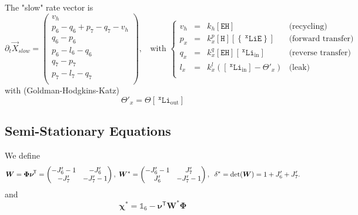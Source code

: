 \documentclass[aps,onecolumn,12pt]{revtex4}
\newcommand{\mychem}[1]{\mathtt{#1}}
\newcommand{\myconc}[1]{\left\lbrack{#1}\right\rbrack}
\newcommand{\spLi}[1]{{~^{\mychem{#1}}\mychem{Li}}}
\newcommand{\spEout}{\mychem{E}}
\newcommand{\spLiE}[1]{\left\lbrace\spLi{#1}\spEout\right\rbrace}
\newcommand{\LiE}[1]{\myconc{\spLiE{#1}}}
\newcommand{\spLiIn}[1]{{\spLi{#1}}_{\mathrm{in}}}
\newcommand{\LiIn}[1]{\myconc{\spLiIn{#1}}}
\newcommand{\spLiOut}[1]{{\spLi{#1}}_{\mathrm{out}}}
\newcommand{\LiOut}[1]{\myconc{\spLiOut{#1}}}
\newcommand{\spEHin}{\mychem{EH}}
\newcommand{\EHin}{\myconc{\spEHin}}
\newcommand{\spproton}{\mychem{H}}
\newcommand{\proton}{\myconc{\spproton}}
\newcommand{\mytrn}[1]{{#1}^{\!\mathsf{T}}}
\newcommand{\mymat}[1]{{\bm{#1}}}
\begin{document}
The "slow" rate vector is
\begin{equation}
	\partial_t\vec{X}_{slow} = 
	\begin{pmatrix}
		v_h\\
		p_6-q_6+p_7-q_7-v_h\\
		q_6-p_6\\
		p_6-l_6-q_6\\
		q_7-p_7\\
		p_7-l_7-q_7\\
	\end{pmatrix}
	,\;\;\text{ with }
	\left\lbrace
	\begin{array}{rcll}
	v_h & = & k_h \EHin & \text{(recycling)}\\
	p_x & = & k_x^p \proton \LiE{x} & \text{(forward transfer)}\\
	q_x & = & k_x^q \EHin \LiIn{x} & \text{(reverse transfer)} \\
	l_x & = & k_x^l \left(\LiIn{x}-\Theta'_x\right) & \text{(leak)}\\
	\end{array}
	\right.
\end{equation}
with (Goldman-Hodgkins-Katz)
\begin{equation}
	\Theta'_x = \Theta \LiOut{x}
\end{equation}

\subsection{Semi-Stationary Equations}
We define
\begin{equation}
	\mymat{W} = \mymat{\Phi}\mytrn{\mymat{\nu}} = \begin{pmatrix} -J'_6-1 & -J'_6 \cr -J'_7 & -J'_7-1\end{pmatrix}
	,\;\mymat{W}^\ast = \begin{pmatrix} -J'_6-1 & J'_7 \cr J'_6 & -J'_7-1\end{pmatrix}
	,\;\;\delta^\ast=\det(\mymat{W})=1+J'_6+J'_7.
\end{equation}
and
\begin{equation}
	\mymat{\chi}^\ast = \mathds{1}_6-\mytrn{\mymat{\nu}}\mymat{W}^\ast\mymat{\Phi}
\end{equation}
\end{document}
